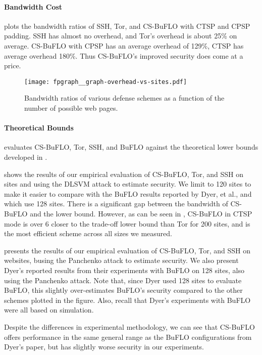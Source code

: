 \documentclass[10pt,journal]{IEEEtran}
\newcommand{\buflo} {BuFLO\xspace}
\newcommand{\csb} {CS-BuFLO\xspace}
\begin{document}
\paragraph*{Bandwidth Cost}  plots the bandwidth ratios
of SSH, Tor, and \csb with CTSP and CPSP padding.  SSH has almost no
overhead, and Tor's overhead is about 25\% on average.  \csb with CPSP
has an average overhead of 129\%, CTSP has average overhead 180\%.  Thus
\csb's improved security does come at a price.

\begin{figure}[t]
  \centering
  \texttt{[image: fpgraph\_\_graph-overhead-vs-sites.pdf]}
  \caption{\label{fig:overhead} Bandwidth ratios of various defense schemes as a function of the number of possible web pages.}
\end{figure}

\paragraph*{Theoretical Bounds}
 evaluates \csb, Tor, SSH, and
\buflo against the theoretical lower bounds developed in
.

 shows the results of our empirical evaluation
of \csb, Tor, and SSH on  sites and using the DLSVM attack to
estimate security.  We limit to 120 sites to make it easier to compare
with the \buflo results reported by Dyer, et al., and which use 128
sites.  There is a significant gap between the bandwidth of \csb and
the lower bound.  However, as can be seen in
, \csb in CTSP mode is over 6 closer
to the trade-off lower bound than Tor for 200 sites, and is the most
efficient scheme across all sizes we measured.

 presents the results of our empirical
evaluation of \csb, Tor, and SSH on  websites, busing the
Panchenko attack to estimate security.  We also present Dyer's
reported results from their experiments with \buflo on 128 sites, also
using the Panchenko attack.  Note that, since Dyer used 128 sites to
evaluate \buflo, this slightly over-estimates \buflo's security
compared to the other schemes plotted in the figure.  Also, recall
that Dyer's experiments with \buflo were all based on simulation.  

Despite the differences in experimental methodology, we can see that
\csb offers performance in the same general range as the \buflo
configurations from Dyer's paper, but has slightly worse security in
our experiments.  
\end{document}
